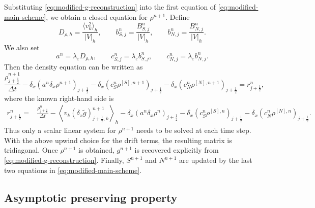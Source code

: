 \documentclass[11pt,twoside]{article}
\numberwithin{equation}{section}
\theoremstyle{plain}
\theoremstyle{nonumberplain}
\begin{document}
{Substituting \eqref{eq:modified-g-reconstruction} into the first equation
of \eqref{eq:modified-main-scheme}, we obtain a closed equation for
\(\rho^{n+1}\). Define
\[
D_{\rho,h}
=
\frac{\langle v_k^2\rangle_h}{|V|_h},
\qquad
b_{S,j}^n
=
\frac{B_{S,j}^n}{|V|_h},
\qquad
b_{N,j}^n
=
\frac{B_{N,j}^n}{|V|_h}.
\]
We also set
\[
a^n=\lambda_\varepsilon D_{\rho,h},
\qquad
c_{S,j}^n=\lambda_\varepsilon b_{S,j}^n,
\qquad
c_{N,j}^n=\lambda_\varepsilon b_{N,j}^n.
\]
Then the density equation can be written as
\begin{equation}\label{eq:modified-rho-equation-two-upwind}
\frac{\rho_{j+\frac12}^{n+1}}{\Delta t}
-
\delta_x\left(
a^n\delta_x\rho^{n+1}
\right)_{j+\frac12}
-
\delta_x\left(
c_S^n\rho^{[S],n+1}
\right)_{j+\frac12}
-
\delta_x\left(
c_N^n\rho^{[N],n+1}
\right)_{j+\frac12}
=
r_{j+\frac12}^n,
\end{equation}
where the known right-hand side is
\[
\begin{aligned}
r_{j+\frac12}^n
=&
\frac{\rho_{j+\frac12}^n}{\Delta t}
-
\left\langle
v_k(\delta_x\widetilde g)_{j+\frac12,k}^{n+1}
\right\rangle_h
-
\delta_x\left(
a^n\delta_x\rho^n
\right)_{j+\frac12}
-
\delta_x\left(
c_S^n\rho^{[S],n}
\right)_{j+\frac12}
-
\delta_x\left(
c_N^n\rho^{[N],n}
\right)_{j+\frac12}.
\end{aligned}
\]
Thus only a scalar linear system for \(\rho^{n+1}\) needs to be solved at
each time step. With the above upwind choice for the drift terms, the
resulting matrix is tridiagonal. Once \(\rho^{n+1}\) is obtained,
\(g^{n+1}\) is recovered explicitly from
\eqref{eq:modified-g-reconstruction}. Finally, \(S^{n+1}\) and \(N^{n+1}\)
are updated by the last two equations in \eqref{eq:modified-main-scheme}.


\subsection{Asymptotic preserving property}

}
\end{document}

